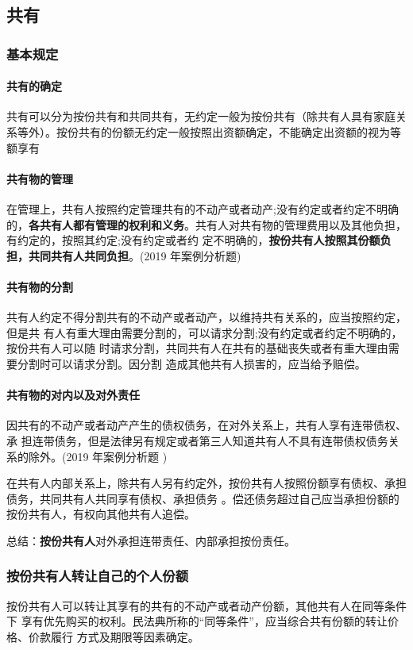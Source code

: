 \documentclass[UTF8,12pt]{ctexart}
\numberwithin{equation}{section} %
\numberwithin{figure}{section}
\numberwithin{table}{section}
\begin{document}
	\subsection{共有}
	
	\subsubsection{基本规定}
	\paragraph{共有的确定}共有可以分为按份共有和共同共有，无约定一般为按份共有（除共有人具有家庭关系等外）。按份共有的份额无约定一般按照出资额确定，不能确定出资额的视为等额享有
	
	\paragraph{共有物的管理}在管理上，共有人按照约定管理共有的不动产或者动产;没有约定或者约定不明确的，\textbf{各共有人都有管理的权利和义务}。共有人对共有物的管理费用以及其他负担，有约定的，按照其约定;没有约定或者约 定不明确的，\textbf{按份共有人按照其份额负担，共同共有人共同负担}。(2019 年案例分析题)
	
	\paragraph{共有物的分割}共有人约定不得分割共有的不动产或者动产，以维持共有关系的，应当按照约定，但是共 有人有重大理由需要分割的，可以请求分割;没有约定或者约定不明确的，按份共有人可以随 时请求分割，共同共有人在共有的基础丧失或者有重大理由需要分割时可以请求分割。因分割 造成其他共有人损害的，应当给予赔偿。
	
	\paragraph{共有物的对内以及对外责任}因共有的不动产或者动产产生的债权债务，在对外关系上，共有人享有连带债权、承 担连带债务，但是法律另有规定或者第三人知道共有人不具有连带债权债务关系的除外。(2019 年案例分析题 )
	
	在共有人内部关系上，除共有人另有约定外，按份共有人按照份额享有债权、承担债务，共同共有人共同享有债权、承担债务 。偿还债务超过自己应当承担份额的按份共有人，有权向其他共有人追偿。
	
	总结：\textbf{按份共有人}对外承担连带责任、内部承担按份责任。
	
	\subsubsection{按份共有人转让自己的个人份额}
	 按份共有人可以转让其享有的共有的不动产或者动产份额，其他共有人在同等条件下 享有优先购买的权利。民法典所称的“同等条件”，应当综合共有份额的转让价格、价款履行 方式及期限等因素确定。
	 
\end{document}
